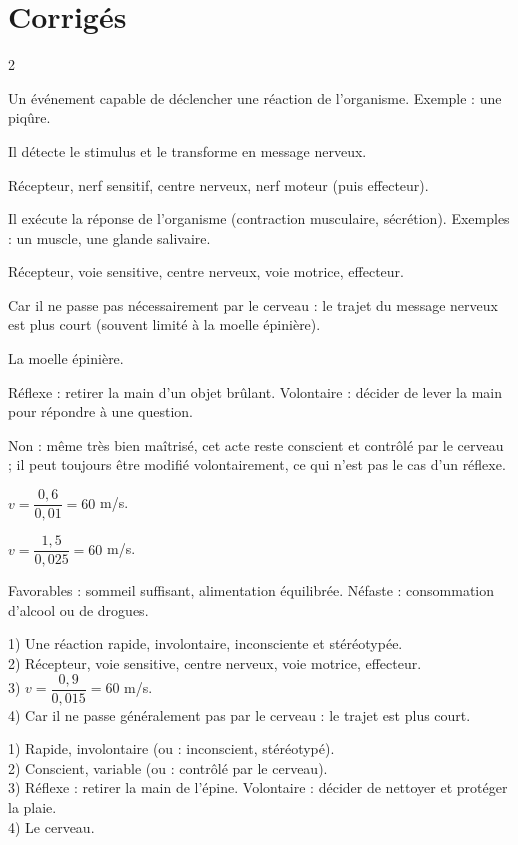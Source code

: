 \section{Corrigés}
\begin{multicols}{2}

Un événement capable de déclencher une réaction de l'organisme. Exemple : une piqûre.

Il détecte le stimulus et le transforme en message nerveux.

Récepteur, nerf sensitif, centre nerveux, nerf moteur (puis effecteur).

Il exécute la réponse de l'organisme (contraction musculaire, sécrétion). Exemples : un
muscle, une glande salivaire.

Récepteur, voie sensitive, centre nerveux, voie motrice, effecteur.

Car il ne passe pas nécessairement par le cerveau : le trajet du message nerveux est plus
court (souvent limité à la moelle épinière).

La moelle épinière.

Réflexe : retirer la main d'un objet brûlant. Volontaire : décider de lever la main pour
répondre à une question.

Non : même très bien maîtrisé, cet acte reste conscient et contrôlé par le cerveau ; il
peut toujours être modifié volontairement, ce qui n'est pas le cas d'un réflexe.

$v=\dfrac{0{,}6}{0{,}01}=60$ m/s.

$v=\dfrac{1{,}5}{0{,}025}=60$ m/s.

Favorables : sommeil suffisant, alimentation équilibrée. Néfaste : consommation d'alcool
ou de drogues.

1) Une réaction rapide, involontaire, inconsciente et stéréotypée.\\
2) Récepteur, voie sensitive, centre nerveux, voie motrice, effecteur.\\
3) $v=\dfrac{0{,}9}{0{,}015}=60$ m/s.\\
4) Car il ne passe généralement pas par le cerveau : le trajet est plus court.

1) Rapide, involontaire (ou : inconscient, stéréotypé).\\
2) Conscient, variable (ou : contrôlé par le cerveau).\\
3) Réflexe : retirer la main de l'épine. Volontaire : décider de nettoyer et protéger la
plaie.\\
4) Le cerveau.


\end{multicols}
